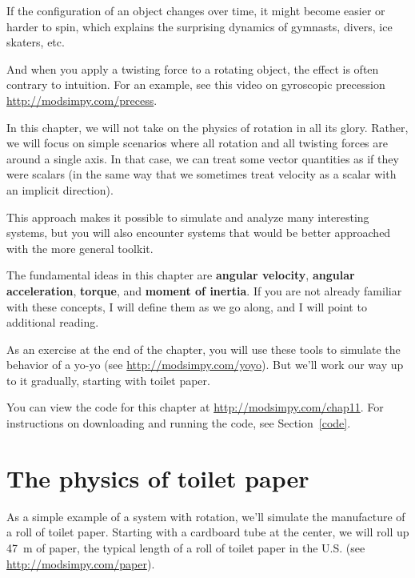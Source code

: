 \documentclass[12pt]{book}
\theoremstyle{exercise}
\begin{document}
If the configuration of an object changes over time, it might become easier or harder to spin, which explains the surprising dynamics of gymnasts, divers, ice skaters, etc.

And when you apply a twisting force to a rotating object, the effect is often contrary to intuition.  For an example, see this video on gyroscopic precession \url{http://modsimpy.com/precess}.

In this chapter, we will not take on the physics of rotation in all its glory.  Rather, we will focus on simple scenarios where all rotation and all twisting forces are around a single axis.  In that case, we can treat some vector quantities as if they were scalars (in the same way that we sometimes treat velocity as a scalar with an implicit direction).

This approach makes it possible to simulate and analyze many interesting systems, but you will also encounter systems that would be better approached with the more general toolkit.

The fundamental ideas in this chapter are {\bf angular velocity}, {\bf angular acceleration}, {\bf torque}, and {\bf moment of inertia}.  If you are not already familiar with these concepts, I will define them as we go along, and I will point to additional reading.

As an exercise at the end of the chapter, you will use these tools to simulate the behavior of a yo-yo (see \url{http://modsimpy.com/yoyo}).  But we'll work our way up to it gradually, starting with toilet paper.

You can view the code for this chapter at \url{http://modsimpy.com/chap11}.  For instructions on downloading and running the code, see Section~\ref{code}.


\section{The physics of toilet paper}
\label{paper}

As a simple example of a system with rotation, we'll simulate the manufacture of a roll of toilet paper.  Starting with a cardboard tube at the center, we will roll up \SI{47}{\meter} of paper, the typical length of a roll of toilet paper in the U.S. (see \url{http://modsimpy.com/paper}).
\end{document}

